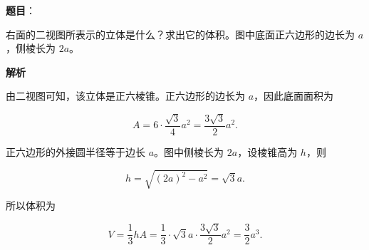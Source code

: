 

\begin{answer}

\textbf{题目}：

右面的二视图所表示的立体是什么？求出它的体积。图中底面正六边形的边长为 $a$，侧棱长为 $2a$。
\nopagebreak[4]
\begin{center}\end{center}
\nopagebreak[4]
\textbf{解析}

由二视图可知，该立体是正六棱锥。正六边形的边长为 $a$，因此底面面积为

\nopagebreak[4]
\[A=6\cdot\frac{\sqrt3}{4}a^2=\frac{3\sqrt3}{2}a^2.\]

正六边形的外接圆半径等于边长 $a$。图中侧棱长为 $2a$，设棱锥高为 $h$，则

\nopagebreak[4]
\[h=\sqrt{(2a)^2-a^2}=\sqrt3a.\]

所以体积为

\nopagebreak[4]
\[V=\frac13hA=\frac13\cdot\sqrt3a\cdot\frac{3\sqrt3}{2}a^2=\frac32a^3.\]


\end{answer}
